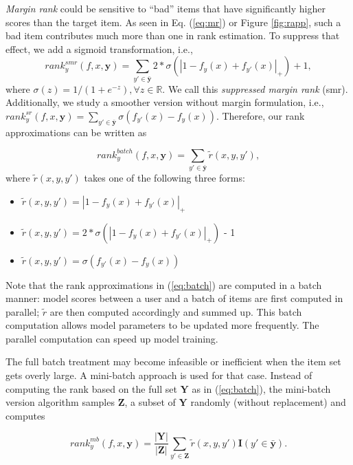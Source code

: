 \documentclass[letterpaper]{article}
\begin{document}
\textit{Margin rank} could be sensitive to ``bad'' items that have significantly higher scores than the target item. As seen in Eq. (\ref{eq:mr}) or Figure \ref{fig:rapp}, such a bad item contributes much more than one in rank estimation. To suppress that effect, we add a sigmoid transformation, i.e.,
\begin{equation}
\label{eq:smr}
rank^{smr}_y(f,x,\textbf{y}) =\sum_{y'\in \bar{\textbf{y}} } 2 * \sigma(|1-f_y(x) + f_{y'}(x)|_+) + 1, %
\end{equation}
where $\sigma(z) = 1 / (1 + e^{-z}), \forall z\in \mathbb{R}$. We call this \textit{suppressed margin rank} (smr). Additionally, we study a smoother version without margin formulation, i.e., $rank^{sr}_y(f,x,\textbf{y}) =\sum_{y'\in \bar{\textbf{y}} } \sigma( f_{y'}(x) - f_{y}(x))$. Therefore, our rank approximations can be written as

\begin{equation}
\label{eq:batch}
rank^{batch}_y(f,x,\textbf{y}) =\sum_{y'\in \bar{\textbf{y}} } \tilde{r}(x,y,y'),
\end{equation}
where $\tilde{r}(x, y, y')$ takes one of the following three forms:
\begin{itemize}
\item $\tilde{r}(x, y, y') = | 1 - f_y(x) + f_{y'}(x)|_+$
\item $\tilde{r}(x, y, y') = 2 * \sigma(| 1 - f_y(x) + f_{y'}(x)|_+)$  - 1
\item $\tilde{r}(x, y, y') = \sigma(f_{y'}(x) - f_y(x))$
\end{itemize}

Note that the rank approximations in (\ref{eq:batch}) are computed in a batch manner: model scores between a user and a batch of items are first computed in parallel; $\tilde{r}$ are then computed accordingly and summed up. This batch computation allows model parameters to be updated more frequently. The parallel computation can speed up model training. %


The full batch treatment may become infeasible or inefficient when the item set gets overly large. A mini-batch approach is used for that case. Instead of computing the rank based on the full set $\textbf{Y}$ as in (\ref{eq:batch}), the mini-batch version algorithm samples $\textbf{Z}$, a subset of $\textbf{Y}$ randomly (without replacement) and computes

\begin{equation}
\label{eq:mrmini}
rank^{mb}_y(f,x,\textbf{y}) = \frac{|\textbf{Y}|}{|\textbf{Z}|}\sum_{y'\in \textbf{Z}} \tilde{r}(x,y,y') \textbf{I} (y'\in\bar{\textbf{y}}).
\end{equation}
\end{document}
